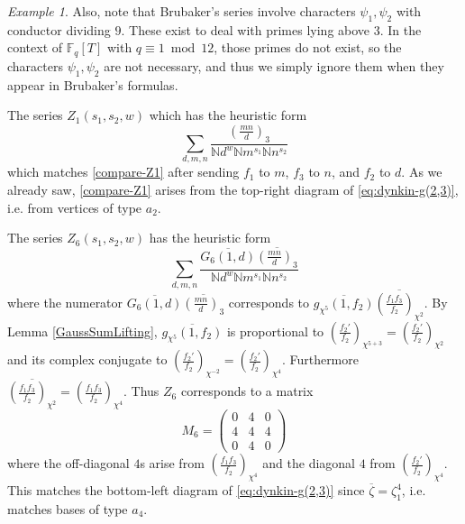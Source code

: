 \documentclass[11pt,letterpaper]{article}
\theoremstyle{definition}
\theoremstyle{remark}
\newtheorem{example}[theorem]{Example}
\numberwithin{equation}{section}
\theoremstyle{dotless}
\newcommand{\gene}{\zeta_1} %
\begin{document}
\begin{example}
Also, note that Brubaker's series involve characters $\psi_1,\psi_2$ with conductor dividing $9$. These exist to deal with primes lying above $3$. In the context of $\mathbb F_q[T]$ with $q \equiv 1\bmod 12$, those primes do not exist, so the characters $\psi_1,\psi_2$ are not necessary, and thus we simply ignore them when they appear in Brubaker's formulas.

The series $Z_1(s_1,s_2,w)$ which has the heuristic form \cite[\S1.3]{BrubakerThesis}  \[ \sum_{d,m,n} \frac{ \left(\frac{mn}{d} \right)_3  }{ \mathbb N d^w \mathbb Nm^{s_1} \mathbb N n^{s_2} }\]   which matches \eqref{compare-Z1} after sending $f_1$ to $m$, $f_3$ to $n$, and $f_2$ to $d$. As we already saw, \eqref{compare-Z1} arises from the top-right diagram of \eqref{eq:dynkin-g(2,3)}, i.e. from vertices of type $a_2$.


The series $Z_6(s_1,s_2,w)$ has the heuristic form  \[ \sum_{d,m,n} \frac{\overline{G_6(1,d)}  \overline{ \left(\frac{mn}{d} \right)_3 }  }{ \mathbb N d^w \mathbb Nm^{s_1} \mathbb N n^{s_2} }\] where the numerator $\overline{G_6(1,d)}  \overline{  \left(\frac{mn}{d} \right)_3 }$  corresponds to $\overline{ g_{\chi^5} (1, f_2) } \overline{ \left(\frac{f_1 f_3 }{f_2} \right)_{\chi^2}} $. By Lemma \ref{GaussSumLifting}, $\overline{ g_{\chi^5} (1, f_2) }$ is proportional to  $ \left(\frac{f_2'}{f_2}\right)_{\chi^{5+3}}= \left(\frac{f_2'}{f_2}\right)_{\chi^{2}}$ and its complex conjugate to  $\left(\frac{f_2'}{f_2}\right)_{\chi^{-2}}= \left(\frac{f_2'}{f_2}\right)_{\chi^{4}}$.  Furthermore  $\overline{ \left(\frac{f_1 f_3 }{f_2} \right)_{\chi^2}}=  \left(\frac{f_1 f_3 }{f_2} \right)_{\chi^4}$.
Thus $Z_6$ corresponds to a matrix \[ M_6 = \begin{pmatrix} 0 & 4 & 0 \\ 4 & 4 & 4 \\ 0 & 4 & 0 \end{pmatrix}\] where the off-diagonal $4$s arise from $\left(\frac{f_1 f_3 }{f_2} \right)_{\chi^4}$ and the diagonal $4$ from $\left(\frac{f_2'}{f_2}\right)_{\chi^{4}}$. This matches the bottom-left diagram of \eqref{eq:dynkin-g(2,3)} since $\overline{\zeta}=\gene^4$, i.e. matches bases of type $a_4$.


\end{example}
\end{document}
